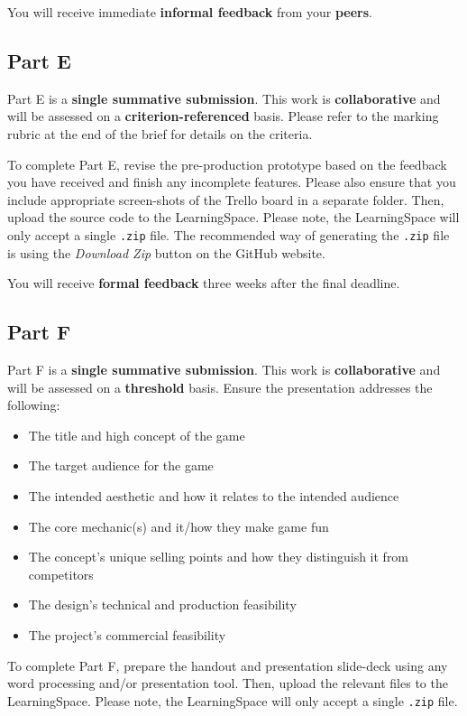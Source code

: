 \documentclass{../fal_assignment}
\begin{document}
You will receive immediate \textbf{informal feedback} from your \textbf{peers}.

\subsection*{Part E}

Part E is a \textbf{single summative submission}. This work is \textbf{collaborative} and will be assessed on a \textbf{criterion-referenced} basis. Please refer to the marking rubric at the end of the brief for details on the criteria.

To complete Part E, revise the pre-production prototype based on the feedback you have received and finish any incomplete features. Please also ensure that you include appropriate screen-shots of the Trello board in a separate folder. Then, upload the source code to the LearningSpace. Please note, the LearningSpace will only accept a single \texttt{.zip} file. The recommended way of generating the \texttt{.zip} file is using the \textit{Download Zip} button on the GitHub website.

You will receive \textbf{formal feedback} three weeks after the final deadline.

\subsection*{Part F}

Part F is a \textbf{single summative submission}. This work is \textbf{collaborative} and will be assessed on a \textbf{threshold} basis. Ensure the presentation addresses the following:

\begin{itemize}
	\item The title and high concept of the game
	\item The target audience for the game
	\item The intended aesthetic and how it relates to the intended audience
	\item The core mechanic(s) and it/how they make game fun
	\item The concept's unique selling points and how they distinguish it from competitors
	\item The design's technical and production feasibility
	\item The project's commercial feasibility
\end{itemize}

To complete Part F, prepare the handout and presentation slide-deck using any word processing and/or presentation tool. Then, upload the relevant files to the LearningSpace. Please note, the LearningSpace will only accept a single \texttt{.zip} file.
\end{document}

